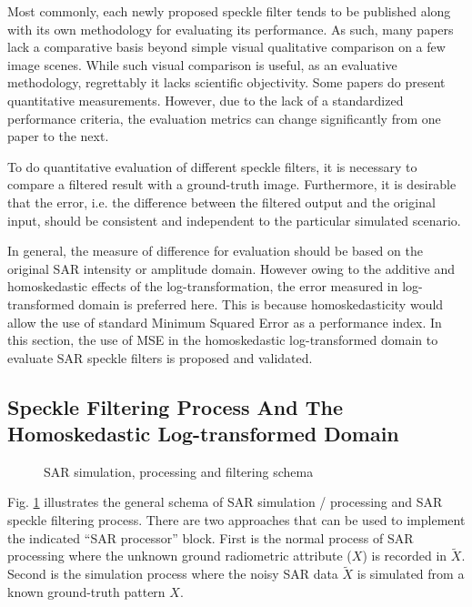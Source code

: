 Most commonly, each newly proposed speckle filter tends to be published along with its own methodology for evaluating its 
	performance. 
As such, many papers lack a comparative basis beyond simple visual qualitative comparison on a few image scenes. 
While such visual comparison is useful, as an evaluative methodology, regrettably it lacks scientific objectivity. 
Some papers do present quantitative measurements. 
However, due to the lack of a standardized performance criteria, 
	the evaluation metrics can change significantly from one paper to the next.

To do quantitative evaluation of different speckle filters, it is necessary to compare a filtered result with a ground-truth image. 
Furthermore, it is desirable that the error, i.e. the difference between the filtered output and the original input, should be consistent and independent to the particular simulated scenario.

In general, the measure of difference for evaluation should be based on the original SAR intensity or amplitude domain. 
However owing to the additive and homoskedastic effects of the log-transformation,
  the error measured in log-transformed domain is preferred here.
This is because homoskedasticity would allow the use of standard Minimum Squared Error as a performance index.   
In this section, the use of MSE in the homoskedastic log-transformed domain to evaluate SAR speckle filters is proposed and validated.

\subsection{ Speckle Filtering Process And The Homoskedastic Log-transformed Domain}
\label{sec:schema_log_images}

\begin{figure}[h]
 \centering
 \epsfxsize=2.4in
 \epsfysize=1.2in
\caption{SAR simulation, processing and filtering schema}
\label{fig:simul_process_filter_schema}
\end{figure}

Fig. \ref{fig:simul_process_filter_schema} illustrates the general schema of SAR simulation / processing and 
SAR speckle filtering process.
There are two approaches that can be used to implement the  indicated ``SAR processor'' block.
First is the normal process of SAR processing where the unknown ground radiometric attribute ($X$) is recorded 
in $\tilde{X}$. Second is the simulation process where the noisy SAR data $\tilde{X}$ is simulated from a known 
ground-truth pattern $X$.

